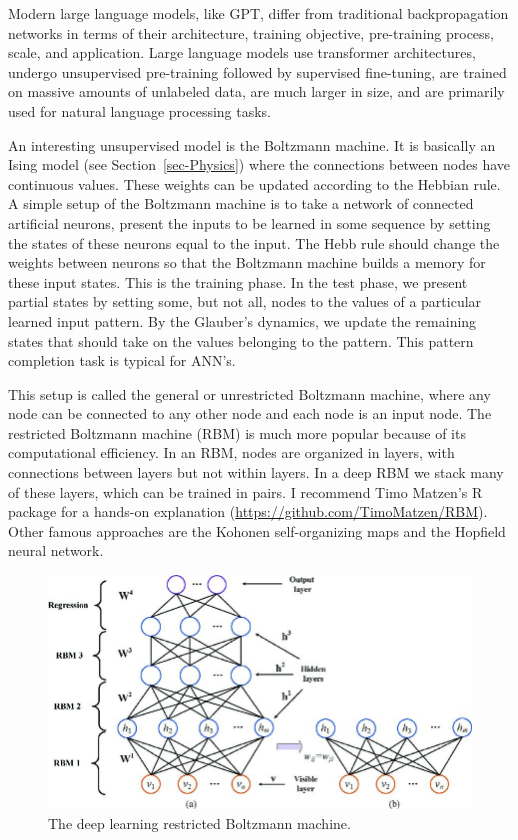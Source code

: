 \documentclass[
  a4paper,
  DIV=11,
  numbers=noendperiod,
  oneside]{scrreprt}
\begin{document}
Modern large language models, like GPT, differ from traditional
backpropagation networks in terms of their architecture, training
objective, pre-training process, scale, and application. Large language
models use transformer architectures, undergo unsupervised pre-training
followed by supervised fine-tuning, are trained on massive amounts of
unlabeled data, are much larger in size, and are primarily used for
natural language processing tasks.

An interesting unsupervised model is the Boltzmann machine. It is
basically an Ising model (see Section~\ref{sec-Physics}) where the
connections between nodes have continuous values. These weights can be
updated according to the Hebbian rule. A simple setup of the Boltzmann
machine is to take a network of connected artificial neurons, present
the inputs to be learned in some sequence by setting the states of these
neurons equal to the input. The Hebb rule should change the weights
between neurons so that the Boltzmann machine builds a memory for these
input states. This is the training phase. In the test phase, we present
partial states by setting some, but not all, nodes to the values of a
particular learned input pattern. By the Glauber's dynamics, we update
the remaining states that should take on the values belonging to the
pattern. This pattern completion task is typical for ANN's.

This setup is called the general or unrestricted Boltzmann machine,
where any node can be connected to any other node and each node is an
input node. The restricted Boltzmann machine (RBM) is much more popular
because of its computational efficiency. In an RBM, nodes are organized
in layers, with connections between layers but not within layers. In a
deep RBM we stack many of these layers, which can be trained in pairs. I
recommend Timo Matzen's R package for a hands-on explanation
(\url{https://github.com/TimoMatzen/RBM}). Other famous approaches are
the Kohonen self-organizing maps and the Hopfield neural network.

\begin{figure}

{\centering \includegraphics{media/ch5n/image5.jpg}

}

\caption{\label{fig-ch5n-img5-old-43}The deep learning restricted
Boltzmann machine.}

\end{figure}
\end{document}
